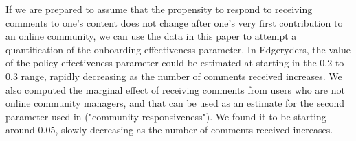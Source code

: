 If we are prepared to assume that the propensity to respond to receiving comments to one's content does not change after one's very first contribution to an online community, we can use the data in this paper to attempt a quantification of the onboarding effectiveness parameter. In Edgeryders, the value of the policy effectiveness parameter could be estimated at starting in the 0.2 to 0.3 range, rapidly decreasing as the number of comments received increases. We also computed the marginal effect of receiving comments from users who are not online community managers, and that can be used as an estimate for the second parameter used in \cite{cottica2015online} ("community responsiveness"). We found it to be starting around 0.05, slowly decreasing as the number of comments received increases. 